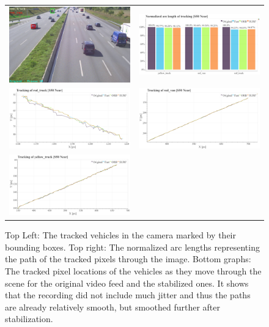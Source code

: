 \begin{figure}[!ht]
  \centering
  \begin{tabular}{cc}
    \includegraphics[width=0.45\linewidth]{diagrams/object_tracking/s50_s_near/frame.png}    &  
    \includegraphics[width=0.475\linewidth]{diagrams/object_tracking/s50_s_near/normalized_arc_lengths.html.png}    \\

    \includegraphics[width=0.475\linewidth]{diagrams/object_tracking/s50_s_near/red_truck.png}    &  
    \includegraphics[width=0.475\linewidth]{diagrams/object_tracking/s50_s_near/red_van.png}    \\  
    \includegraphics[width=0.475\linewidth]{diagrams/object_tracking/s50_s_near/yellow_truck.png}   
  \end{tabular}
  \caption{Top Left:
  The tracked vehicles in the camera  marked by their bounding boxes. 
  Top right: 
  The normalized arc lengths representing the path of the tracked pixels through the image.
  Bottom graphs:
  The tracked pixel locations of the vehicles as they move through the scene for the original video feed and the stabilized ones.
  It shows that the recording did not include much jitter and thus the paths are already relatively smooth, but smoothed further after stabilization.
  }
  \label{fig:object_tracking_appendix_s50_s_near}
\end{figure}

